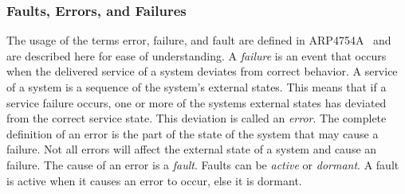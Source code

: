\subsubsection{Faults, Errors, and Failures}
\label{sec:terminology}
The usage of the terms error, failure, and fault are defined in ARP4754A~\cite{SAE:ARP4754A} and are described here for ease of understanding. A \textit{failure} is an event that occurs when the delivered service of a system deviates from correct behavior. A service of a system is a sequence of the system's external states. This means that if a service failure occurs, one or more of the systems external states has deviated from the correct service state. This deviation is called an \textit{error}. The complete definition of an error is the part of the state of the system that may cause a failure. Not all errors will affect the external state of a system and cause an failure. The cause of an error is a \textit{fault}. Faults can be \textit{active} or \textit{dormant}. A fault is active when it causes an error to occur, else it is dormant.

